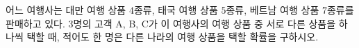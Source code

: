어느 여행사는 대만 여행 상품 $4$종류, 태국 여행 상품 $5$종류, 베트남 여행 상품 $7$종류를 판매하고 있다. $3$명의 고객 A, B, C가 이 여행사의 여행 상품 중 서로 다른 상품을 하나씩 택할 때, 적어도 한 명은 다른 나라의 여행 상품을 택할 확률을 구하시오.
